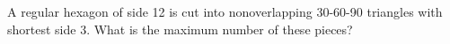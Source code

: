 A regular hexagon of side 12 is cut into nonoverlapping 30-60-90 triangles with shortest side 3. What is the maximum number of these pieces?
